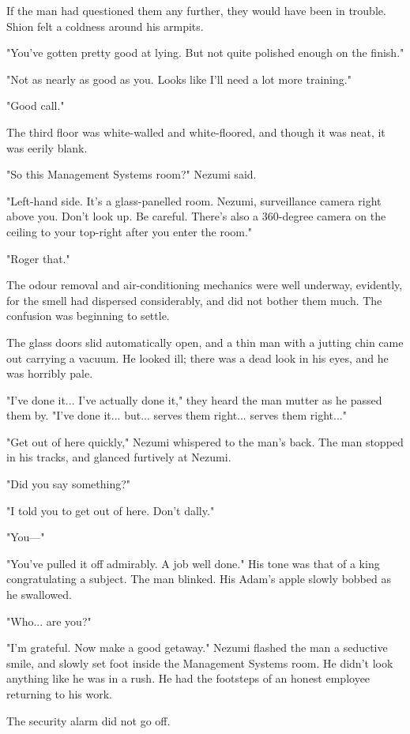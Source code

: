 If the man had questioned them any further, they would have been in
trouble. Shion felt a coldness around his armpits.

"You've gotten pretty good at lying. But not quite polished enough on
the finish."

"Not as nearly as good as you. Looks like I'll need a lot more
training."

"Good call."

The third floor was white-walled and white-floored, and though it was
neat, it was eerily blank.

"So this Management Systems room?" Nezumi said.

"Left-hand side. It's a glass-panelled room. Nezumi, surveillance camera
right above you. Don't look up. Be careful. There's also a 360-degree
camera on the ceiling to your top-right after you enter the room."

"Roger that."

The odour removal and air-conditioning mechanics were well underway,
evidently, for the smell had dispersed considerably, and did not bother
them much. The confusion was beginning to settle.

The glass doors slid automatically open, and a thin man with a jutting
chin came out carrying a vacuum. He looked ill; there was a dead look in
his eyes, and he was horribly pale.

"I've done it... I've actually done it," they heard the man mutter as he
passed them by. "I've done it... but... serves them right... serves them
right..."

"Get out of here quickly," Nezumi whispered to the man's back. The man
stopped in his tracks, and glanced furtively at Nezumi.

"Did you say something?"

"I told you to get out of here. Don't dally."

"You---"

"You've pulled it off admirably. A job well done." His tone was that of
a king congratulating a subject. The man blinked. His Adam's apple
slowly bobbed as he swallowed.

"Who... are you?"

"I'm grateful. Now make a good getaway." Nezumi flashed the man a
seductive smile, and slowly set foot inside the Management Systems room.
He didn't look anything like he was in a rush. He had the footsteps of
an honest employee returning to his work.

The security alarm did not go off.

